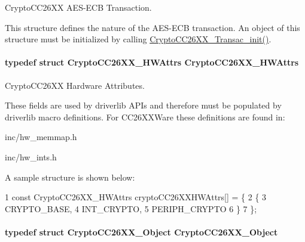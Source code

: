 Crypto\+C\+C26\+X\+X A\+E\+S-\/\+E\+C\+B Transaction. 

This structure defines the nature of the A\+E\+S-\/\+E\+C\+B transaction. An object of this structure must be initialized by calling \hyperlink{_crypto_c_c26_x_x_8h_afb3ea8faceda234cdd62c5f53e203946}{Crypto\+C\+C26\+X\+X\+\_\+\+Transac\+\_\+init()}. 
\paragraph[{Crypto\+C\+C26\+X\+X\+\_\+\+H\+W\+Attrs}]{\setlength{\rightskip}{0pt plus 5cm}typedef struct {\bf Crypto\+C\+C26\+X\+X\+\_\+\+H\+W\+Attrs}  {\bf Crypto\+C\+C26\+X\+X\+\_\+\+H\+W\+Attrs}}\label{_crypto_c_c26_x_x_8h_a43b8004f918cfc847b65ebe981970da7}


Crypto\+C\+C26\+X\+X Hardware Attributes. 

These fields are used by driverlib A\+P\+Is and therefore must be populated by driverlib macro definitions. For C\+C26\+X\+X\+Ware these definitions are found in\+:
\begin{DoxyItemize}
\item inc/hw\+\_\+memmap.\+h
\item inc/hw\+\_\+ints.\+h
\end{DoxyItemize}

A sample structure is shown below\+: 
\begin{DoxyCode}
1 const CryptoCC26XX\_HWAttrs cryptoCC26XXHWAttrs[] = \{
2     \{
3         CRYPTO\_BASE,
4         INT\_CRYPTO,
5         PERIPH\_CRYPTO
6     \}
7 \};
\end{DoxyCode}
\paragraph[{Crypto\+C\+C26\+X\+X\+\_\+\+Object}]{\setlength{\rightskip}{0pt plus 5cm}typedef struct {\bf Crypto\+C\+C26\+X\+X\+\_\+\+Object}  {\bf Crypto\+C\+C26\+X\+X\+\_\+\+Object}}\label{_crypto_c_c26_x_x_8h_a1d3ce506f41ca09dbb4fc02615c54d4e}


